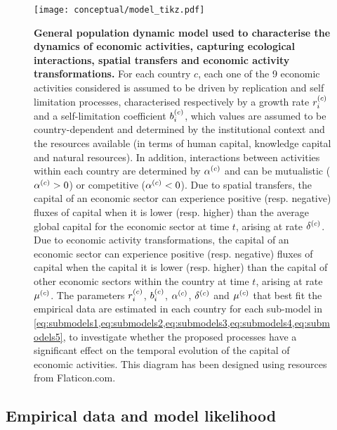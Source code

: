 

\begin{figure}[ht]
  \texttt{[image: conceptual/model\_tikz.pdf]}
  \centering
  \caption{\small
      \textbf{General population dynamic model used to characterise the dynamics of economic activities, capturing ecological interactions, spatial transfers and economic activity transformations.}
      For each country $c$, each one of the 9 economic activities considered is assumed to be driven by replication and self limitation processes, characterised respectively by a growth rate $r_i^{(c)}$ and a self-limitation coefficient $b_i^{(c)}$, which values are assumed to be country-dependent and determined by the institutional context and the resources available (in terms of human capital, knowledge capital and natural resources). 
      In addition, interactions between activities within each country are determined by $\alpha^{(c)}$ and can be mutualistic ($\alpha^{(c)} > 0$) or competitive ($\alpha^{(c)}< 0$).
      Due to spatial transfers, the capital of an economic sector can experience positive (resp. negative) fluxes of capital when it is lower (resp. higher) than the average global capital for the economic sector at time $t$, arising at rate $\delta^{(c)}$.
      Due to economic activity transformations, the capital of an economic sector can experience positive (resp. negative) fluxes of capital when the capital it is lower (resp. higher) than the capital of other economic sectors within the country at time $t$, arising at rate $\mu^{(c)}$.
      The parameters $r_i^{(c)}$, $b_i^{(c)}$, $\alpha^{(c)}$, $\delta^{(c)}$ and $\mu^{(c)}$ that best fit the empirical data are estimated in each country for each sub-model in \cref{eq:submodels1,eq:submodels2,eq:submodels3,eq:submodels4,eq:submodels5}, to investigate whether the proposed processes have a significant effect on the temporal evolution of the capital of economic activities. This diagram has been designed using resources from Flaticon.com.
      }\label{fig:model}
\end{figure}
\FloatBarrier
    
\subsection{Empirical data and model likelihood}

